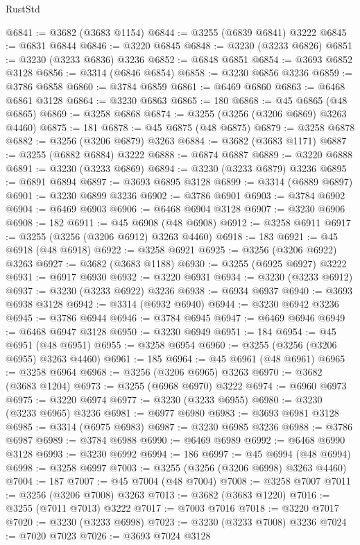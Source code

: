 \begin{lexlean}{RustStd}
\begin{coremodule}
{\begin{coremodule}
{{{{{{{{{{{{{{{{{{{{{{{{{{{{{{{{{{{{{@6841 := @3682 (@3683 @1154)
@6844 := @3255 (@6839 @6841) @3222
@6845 := @6831 @6844
@6846 := @3220 @6845
@6848 := @3230 (@3233 @6826)
@6851 := @3230 (@3233 @6836) @3236
@6852 := @6848 @6851
@6854 := @3693 @6852 @3128
@6856 := @3314 (@6846 @6854)
@6858 := @3230 @6856 @3236
@6859 := @3786 @6858
@6860 := @3784 @6859
@6861 := @6469 @6860
@6863 := @6468 @6861 @3128
@6864 := @3230 @6863
@6865 := 180
@6868 := @45 @6865 (@48 @6865)
@6869 := @3258 @6868
@6874 := @3255 (@3256 (@3206 @6869) @3263 @4460)
@6875 := 181
@6878 := @45 @6875 (@48 @6875)
@6879 := @3258 @6878
@6882 := @3256 (@3206 @6879) @3263
@6884 := @3682 (@3683 @1171)
@6887 := @3255 (@6882 @6884) @3222
@6888 := @6874 @6887
@6889 := @3220 @6888
@6891 := @3230 (@3233 @6869)
@6894 := @3230 (@3233 @6879) @3236
@6895 := @6891 @6894
@6897 := @3693 @6895 @3128
@6899 := @3314 (@6889 @6897)
@6901 := @3230 @6899 @3236
@6902 := @3786 @6901
@6903 := @3784 @6902
@6904 := @6469 @6903
@6906 := @6468 @6904 @3128
@6907 := @3230 @6906
@6908 := 182
@6911 := @45 @6908 (@48 @6908)
@6912 := @3258 @6911
@6917 := @3255 (@3256 (@3206 @6912) @3263 @4460)
@6918 := 183
@6921 := @45 @6918 (@48 @6918)
@6922 := @3258 @6921
@6925 := @3256 (@3206 @6922) @3263
@6927 := @3682 (@3683 @1188)
@6930 := @3255 (@6925 @6927) @3222
@6931 := @6917 @6930
@6932 := @3220 @6931
@6934 := @3230 (@3233 @6912)
@6937 := @3230 (@3233 @6922) @3236
@6938 := @6934 @6937
@6940 := @3693 @6938 @3128
@6942 := @3314 (@6932 @6940)
@6944 := @3230 @6942 @3236
@6945 := @3786 @6944
@6946 := @3784 @6945
@6947 := @6469 @6946
@6949 := @6468 @6947 @3128
@6950 := @3230 @6949
@6951 := 184
@6954 := @45 @6951 (@48 @6951)
@6955 := @3258 @6954
@6960 := @3255 (@3256 (@3206 @6955) @3263 @4460)
@6961 := 185
@6964 := @45 @6961 (@48 @6961)
@6965 := @3258 @6964
@6968 := @3256 (@3206 @6965) @3263
@6970 := @3682 (@3683 @1204)
@6973 := @3255 (@6968 @6970) @3222
@6974 := @6960 @6973
@6975 := @3220 @6974
@6977 := @3230 (@3233 @6955)
@6980 := @3230 (@3233 @6965) @3236
@6981 := @6977 @6980
@6983 := @3693 @6981 @3128
@6985 := @3314 (@6975 @6983)
@6987 := @3230 @6985 @3236
@6988 := @3786 @6987
@6989 := @3784 @6988
@6990 := @6469 @6989
@6992 := @6468 @6990 @3128
@6993 := @3230 @6992
@6994 := 186
@6997 := @45 @6994 (@48 @6994)
@6998 := @3258 @6997
@7003 := @3255 (@3256 (@3206 @6998) @3263 @4460)
@7004 := 187
@7007 := @45 @7004 (@48 @7004)
@7008 := @3258 @7007
@7011 := @3256 (@3206 @7008) @3263
@7013 := @3682 (@3683 @1220)
@7016 := @3255 (@7011 @7013) @3222
@7017 := @7003 @7016
@7018 := @3220 @7017
@7020 := @3230 (@3233 @6998)
@7023 := @3230 (@3233 @7008) @3236
@7024 := @7020 @7023
@7026 := @3693 @7024 @3128
}}}}}}}}}}}}}}}}}}}}}}}}}}}}}}}}}}}}}
\end{coremodule}}
\end{coremodule}
\end{lexlean}
